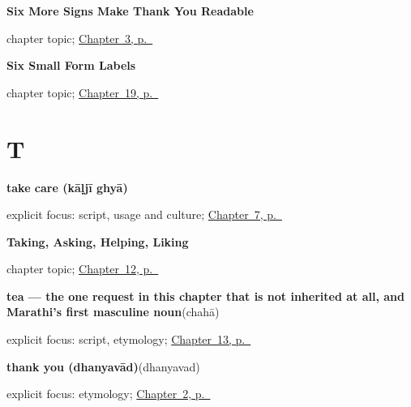 \noindent\begin{minipage}[t]{\linewidth}
\raggedright
\textbf{Six More Signs Make Thank You Readable}\par
\footnotesize chapter topic; \hyperref[ch:thanks-script-b]{Chapter~3, p.~\pageref*{ch:thanks-script-b}}
\end{minipage}\par\smallskip

\noindent\begin{minipage}[t]{\linewidth}
\raggedright
\textbf{Six Small Form Labels}\par
\footnotesize chapter topic; \hyperref[ch:mr-a1-form-labels]{Chapter~19, p.~\pageref*{ch:mr-a1-form-labels}}
\end{minipage}\par\smallskip

\section*{T}

\noindent\begin{minipage}[t]{\linewidth}
\raggedright
\textbf{take care (kāḷjī ghyā)}\enspace\emph{ }\par
\footnotesize explicit focus: script, usage and culture; \hyperref[ch:farewells]{Chapter~7, p.~\pageref*{ch:farewells}}
\end{minipage}\par\smallskip

\noindent\begin{minipage}[t]{\linewidth}
\raggedright
\textbf{Taking, Asking, Helping, Liking}\par
\footnotesize chapter topic; \hyperref[ch:mr-doing-verbs]{Chapter~12, p.~\pageref*{ch:mr-doing-verbs}}
\end{minipage}\par\smallskip

\noindent\begin{minipage}[t]{\linewidth}
\raggedright
\textbf{tea — the one request in this chapter that is not inherited at all, and Marathi's first masculine noun}\enspace\emph{}\enspace(chahā)\par
\footnotesize explicit focus: script, etymology; \hyperref[ch:mr-request-food-drink]{Chapter~13, p.~\pageref*{ch:mr-request-food-drink}}
\end{minipage}\par\smallskip

\noindent\begin{minipage}[t]{\linewidth}
\raggedright
\textbf{thank you (dhanyavād)}\enspace\emph{}\enspace(dhanyavad)\par
\footnotesize explicit focus: etymology; \hyperref[ch:thanks-script-a]{Chapter~2, p.~\pageref*{ch:thanks-script-a}}
\end{minipage}\par\smallskip

